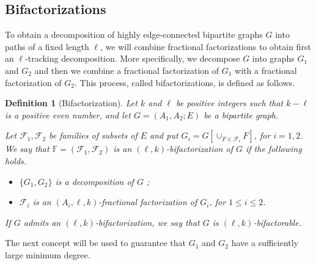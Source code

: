 \documentclass[12pt,reqno,a4paper]{amsart}
\newtheorem{definition}[theorem]{Definition}
\begin{document}
\subsection{Bifactorizations}\label{sec:bip-factors}


To obtain a decomposition of highly edge-connected bipartite graphs
$G$ into paths of a fixed length $\ell$, we will combine fractional
factorizations to obtain first an \(\ell\)-tracking decomposition.
More specifically, we decompose $G$ into 
graphs $G_1$ and $G_2$ and then we combine 
a fractional factorization of \(G_1\) with a fractional factorization of \(G_2\). 
This process, called bifactorizations, is defined as follows.


\begin{definition}[Bifactorization]\label{def:bip-factor}
Let \(k\) and \(\ell\) be positive integers such that $k-\ell$ is a positive 
even number, and let \(G=(A_1,A_2;E)\) be a bipartite graph. 

Let \(\mathcal{F}_1,\mathcal{F}_2\) be families of subsets of \(E\)
and put \(G_i = G[\cup_{F\in\mathcal{F}_i}F]\), for \(i=1,2\).
We say that \(\mathbb{F}=(\mathcal{F}_1,\mathcal{F}_2)\) is an 
\emph{\((\ell,k)\)-bifactorization of \(G\)}
if the following holds.
\begin{itemize}
 \item [(i)] \(\{G_1,G_2\}\) is a decomposition of \(G\) ;
 \item [(ii)] \(\mathcal{F}_i\) is an \((A_i,\ell,k)\)-fractional 
factorization of $G_i$, for $1\leq i\leq 2$.
\end{itemize}
If \(G\) admits an \((\ell,k)\)-bifactorization,
we say that \(G\) is \((\ell,k)\)-bifactorable.
\end{definition}




The next concept  
will be used to guarantee 
that \(G_1\) and \(G_2\) have a sufficiently 
large minimum degree.%
\end{document}
